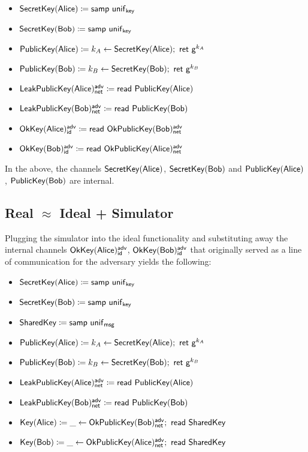 \begin{itemize}
\item $\SecretKey(\Alice) \coloneqq \samp{\unif_\key}$
\item $\SecretKey(\Bob) \coloneqq \samp{\unif_\key}$
\item $\PublicKey(\Alice) \coloneqq k_A \leftarrow \SecretKey(\Alice); \ \ret{\gen^{k_A}}$
\item $\PublicKey(\Bob) \coloneqq k_B \leftarrow \SecretKey(\Bob); \ \ret{\gen^{k_B}}$
\item $\LeakPublicKey(\Alice)^\adv_\net \coloneqq \read{\PublicKey(\Alice)}$
\item $\LeakPublicKey(\Bob)^\adv_\net \coloneqq \read{\PublicKey(\Bob)}$
\item $\OkKey(\Alice)^\adv_\id \coloneqq \read{\OkPublicKey(\Bob)^\adv_\net}$
\item $\OkKey(\Bob)^\adv_\id \coloneqq \read{\OkPublicKey(\Alice)^\adv_\net}$
\end{itemize}
In the above, the channels $\SecretKey(\Alice)$, $\SecretKey(\Bob)$ and $\PublicKey(\Alice)$, $\PublicKey(\Bob)$ are internal.

\subsection{Real \texorpdfstring{$\approx$}{Approximates} Ideal + Simulator}
Plugging the simulator into the ideal functionality and substituting away the internal channels $\OkKey(\Alice)^\adv_\id$, $\OkKey(\Bob)^\adv_\id$ that originally served as a line of communication for the adversary yields the following:

\begin{itemize}
\item $\SecretKey(\Alice) \coloneqq \samp{\unif_\key}$
\item $\SecretKey(\Bob) \coloneqq \samp{\unif_\key}$
\item $\SharedKey \coloneqq \samp{\unif_\msg}$
\item $\PublicKey(\Alice) \coloneqq k_A \leftarrow \SecretKey(\Alice); \ \ret{\gen^{k_A}}$
\item $\PublicKey(\Bob) \coloneqq k_B \leftarrow \SecretKey(\Bob); \ \ret{\gen^{k_B}}$
\item $\LeakPublicKey(\Alice)^\adv_\net \coloneqq \read{\PublicKey(\Alice)}$
\item $\LeakPublicKey(\Bob)^\adv_\net \coloneqq \read{\PublicKey(\Bob)}$
\item $\Key(\Alice) \coloneqq \_ \leftarrow \OkPublicKey(\Bob)^\adv_\net; \ \read{\SharedKey}$
\item $\Key(\Bob) \coloneqq \_ \leftarrow \OkPublicKey(\Alice)^\adv_\net; \ \read{\SharedKey}$
\end{itemize}

